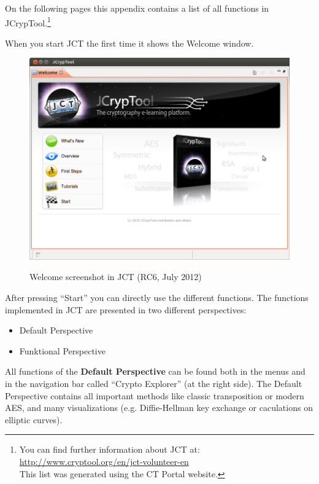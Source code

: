 \noindent On the following pages this appendix contains a list of all
functions in JCrypTool.\footnote{%
  You can find further information about JCT at:
  \url{http://www.cryptool.org/en/jct-volunteer-en} \\
  This list was generated using the CT Portal website.}

\noindent When you start JCT the first time it shows the Welcome window.

\begin{figure}[hb]
\begin{center}
\includegraphics[scale=0.45, angle=0] {figures/JCT-Welcome-EN}
\hypertarget{welcome-JCT}{}
\caption{Welcome screenshot in JCT (RC6, July 2012)} 
\label{Welcome-Screenshot-JCT}
\end{center}
\end{figure}
After pressing ``Start'' you can directly use the different functions.
The functions implemented in JCT are presented in two different perspectives:
\begin{itemize}
   \item Default Perspective
   \item Funktional Perspective
 \end{itemize}

All functions of the {\bf Default Perspective} can be found both in the menus and in the navigation bar called ``Crypto Explorer'' (at the right side).
The Default Perspective contains all important methods like classic transposition or modern AES, and many visualizations (e.g. Diffie-Hellman key exchange or caculations on elliptic curves).

